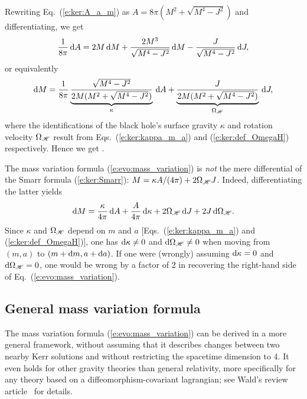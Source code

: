 Rewriting Eq.~(\ref{e:ker:A_a_m}) as $A = 8 \pi (M^2 + \sqrt{M^4 - J^2})$
and differentiating, we get
\[
\frac{1}{8\pi} \, \mathrm{d} A =  2 M\,  \mathrm{d} M + \frac{2M^3}{\sqrt{M^4-J^2}}\, \mathrm{d} M
    - \frac{J}{\sqrt{M^4-J^2}}\, \mathrm{d} J ,
\]
or equivalently
\[
    \mathrm{d} M = \frac{1}{8\pi}
\underbrace{\frac{\sqrt{M^4-J^2}}{2M(M^2+\sqrt{M^4-J^2})}}_{\kappa} \, \mathrm{d} A
+ \underbrace{\frac{J}{2M(M^2+\sqrt{M^4-J^2})}}_{\Omega_{\mathscr{H}}} \, \mathrm{d} J  ,
\]
where the identifications of the black hole's surface gravity $\kappa$ and
rotation velocity $\Omega_{\mathscr{H}}$ result from Eqs.~(\ref{e:ker:kappa_m_a})
and (\ref{e:ker:def_OmegaH}) respectively. Hence we get
\be \label{e:evo:mass_variation}
     .
\ee
\begin{remark}
The mass variation formula (\ref{e:evo:mass_variation}) is \emph{not}
the mere differential of the Smarr formula (\ref{e:ker:Smarr}):
$ M =  \kappa A/(4\pi) + 2 \Omega_{\mathscr{H}} J$.
Indeed, differentiating the latter yields
\[
    \mathrm{d} M = \frac{\kappa}{4\pi} \, \mathrm{d} A +  \frac{A}{4\pi} \, \mathrm{d} \kappa
        + 2 \Omega_{\mathscr{H}} \, \mathrm{d} J  + 2 J \, \mathrm{d}\Omega_{\mathscr{H}} .
\]
Since $\kappa$ and $\Omega_{\mathscr{H}}$ depend on $m$ and $a$ [Eqs.~(\ref{e:ker:kappa_m_a})
and (\ref{e:ker:def_OmegaH})], one has
$\mathrm{d}\kappa \neq 0$ and $\mathrm{d}\Omega_{\mathscr{H}}\neq 0$ when moving
from $(m,a)$ to $(m+\mathrm{d} m, a+\mathrm{d} a)$.
If one were (wrongly) assuming $\mathrm{d}\kappa = 0$ and $\mathrm{d}\Omega_{\mathscr{H}} = 0$, one would
be wrong by a factor of 2 in recovering the right-hand side of
Eq.~(\ref{e:evo:mass_variation}).
\end{remark}

\subsection{General mass variation formula} \label{s:evo:gen_mass_variation}

The mass variation formula (\ref{e:evo:mass_variation}) can be derived in
a more general framework, without assuming that it describes changes between
two nearby Kerr solutions \cite{BardeCH73,Carte79} and without restricting
the spacetime dimension to 4. It even holds
for other gravity theories than general relativity, more specifically
for any theory based on a diffeomorphism-covariant lagrangian; see Wald's review
article~\cite{Wald01} for details.

